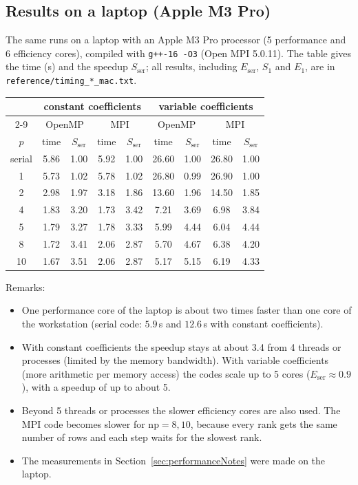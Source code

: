\documentclass[11pt]{article}
\begin{document}
\subsection{Results on a laptop (Apple M3 Pro)}
The same runs on a laptop with an Apple M3 Pro processor (5 performance and 6 efficiency cores), compiled with \texttt{g++-16 -O3} (Open MPI 5.0.11). The table gives the time (s) and the speedup $S_{\text{ser}}$; all results, including $E_{\text{ser}}$, $S_1$ and $E_1$, are in \texttt{reference/timing\_*\_mac.txt}.
\begin{table}[H]\footnotesize
\begin{center}
\begin{tabular}{|c|cc|cc|cc|cc|} \hline
 & \multicolumn{4}{c|}{constant coefficients} & \multicolumn{4}{c|}{variable coefficients} \\ \cline{2-9}
 & \multicolumn{2}{c|}{OpenMP} & \multicolumn{2}{c|}{MPI} & \multicolumn{2}{c|}{OpenMP} & \multicolumn{2}{c|}{MPI} \\
$p$ & time & $S_{\text{ser}}$ & time & $S_{\text{ser}}$ & time & $S_{\text{ser}}$ & time & $S_{\text{ser}}$ \\ \hline
serial & 5.86 & 1.00 & 5.92 & 1.00 & 26.60 & 1.00 & 26.80 & 1.00 \\
1 & 5.73 & 1.02 & 5.78 & 1.02 & 26.80 & 0.99 & 26.90 & 1.00 \\
2 & 2.98 & 1.97 & 3.18 & 1.86 & 13.60 & 1.96 & 14.50 & 1.85 \\
4 & 1.83 & 3.20 & 1.73 & 3.42 & 7.21 & 3.69 & 6.98 & 3.84 \\
5 & 1.79 & 3.27 & 1.78 & 3.33 & 5.99 & 4.44 & 6.04 & 4.44 \\
8 & 1.72 & 3.41 & 2.06 & 2.87 & 5.70 & 4.67 & 6.38 & 4.20 \\
10 & 1.67 & 3.51 & 2.06 & 2.87 & 5.17 & 5.15 & 6.19 & 4.33 \\
\hline
\end{tabular}
\end{center}
\end{table}
Remarks:
\begin{itemize}
\item One performance core of the laptop is about two times faster than one core of the workstation (serial code: $5.9$\,s and $12.6$\,s with constant coefficients).
\item With constant coefficients the speedup stays at about 3.4 from 4 threads or processes (limited by the memory bandwidth). With variable coefficients (more arithmetic per memory access) the codes scale up to 5 cores ($E_{\text{ser}}\approx 0.9$), with a speedup of up to about 5.
\item Beyond 5 threads or processes the slower efficiency cores are also used. The MPI code becomes slower for $\mbox{np}=8,10$, because every rank gets the same number of rows and each step waits for the slowest rank.
\item The measurements in Section~\ref{sec:performanceNotes} were made on the laptop.
\end{itemize}
\end{document}
